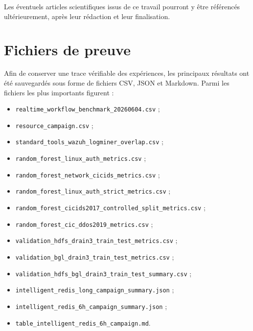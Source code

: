 Les éventuels articles scientifiques issus de ce travail pourront y être référencés ultérieurement, après leur rédaction et leur finalisation.


\section{Fichiers de preuve}

Afin de conserver une trace vérifiable des expériences, les principaux résultats ont été sauvegardés sous forme de fichiers CSV, JSON et Markdown. Parmi les fichiers les plus importants figurent :

\begin{itemize}

\item \texttt{realtime\_workflow\_benchmark\_20260604.csv} ;

\item \texttt{resource\_campaign.csv} ;


\item \texttt{standard\_tools\_wazuh\_logminer\_overlap.csv} ;

\item \texttt{random\_forest\_linux\_auth\_metrics.csv} ;

\item \texttt{random\_forest\_network\_cicids\_metrics.csv} ;

\item \texttt{random\_forest\_linux\_auth\_strict\_metrics.csv} ;

\item \texttt{random\_forest\_cicids2017\_controlled\_split\_metrics.csv} ;

\item \texttt{random\_forest\_cic\_ddos2019\_metrics.csv} ;

\item \texttt{validation\_hdfs\_drain3\_train\_test\_metrics.csv} ;

\item \texttt{validation\_bgl\_drain3\_train\_test\_metrics.csv} ;

\item \texttt{validation\_hdfs\_bgl\_drain3\_train\_test\_summary.csv} ;

\item \texttt{intelligent\_redis\_long\_campaign\_summary.json} ;

\item \texttt{intelligent\_redis\_6h\_campaign\_summary.json} ;

\item \texttt{table\_intelligent\_redis\_6h\_campaign.md}.

\end{itemize}

